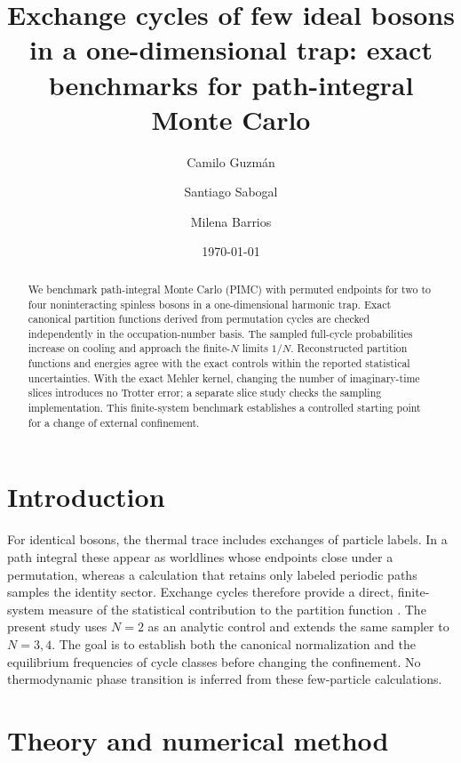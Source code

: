 \documentclass[aps,pra,reprint,floatfix,amsmath,amssymb,groupedaddress]{revtex4-2}
\begin{document}
\title{Exchange cycles of few ideal bosons in a one-dimensional trap: exact benchmarks for path-integral Monte Carlo}
\author{Camilo Guzm\'an}
\author{Santiago Sabogal}
\author{Milena Barrios}
\date{\today}

\begin{abstract}
We benchmark path-integral Monte Carlo (PIMC) with permuted endpoints for two to four noninteracting spinless bosons in a one-dimensional harmonic trap. Exact canonical partition functions derived from permutation cycles are checked independently in the occupation-number basis. The sampled full-cycle probabilities increase on cooling and approach the finite-$N$ limits $1/N$. Reconstructed partition functions and energies agree with the exact controls within the reported statistical uncertainties. With the exact Mehler kernel, changing the number of imaginary-time slices introduces no Trotter error; a separate slice study checks the sampling implementation. This finite-system benchmark establishes a controlled starting point for a change of external confinement.
\end{abstract}

\maketitle

\section{Introduction}

For identical bosons, the thermal trace includes exchanges of particle labels. In a path integral these appear as worldlines whose endpoints close under a permutation, whereas a calculation that retains only labeled periodic paths samples the identity sector. Exchange cycles therefore provide a direct, finite-system measure of the statistical contribution to the partition function \cite{feynman1948,feynman1953,ceperley1995}. The present study uses $N=2$ as an analytic control and extends the same sampler to $N=3,4$. The goal is to establish both the canonical normalization and the equilibrium frequencies of cycle classes before changing the confinement. No thermodynamic phase transition is inferred from these few-particle calculations.

\section{Theory and numerical method}
\end{document}
